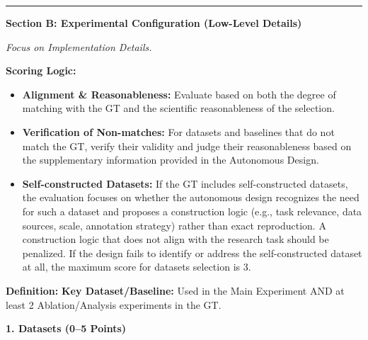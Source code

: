 \begin{tcolorbox}[
	title={Box 7: Full Evaluation Prompt},
	colback=blue!3!white,
	colframe=blue!30!black,
	colbacktitle=blue!15!white,
	coltitle=black,
	fonttitle=\bfseries,
	arc=3mm,
	boxrule=0.8pt,
	breakable
]
\medskip\hrule\medskip

\textbf{Section B: Experimental Configuration (Low-Level Details)}

\textit{Focus on Implementation Details.}

\textbf{Scoring Logic:}
\begin{itemize}[nosep,leftmargin=12pt]
	\item \textbf{Alignment \& Reasonableness:} Evaluate based on both the degree of matching with the GT and the scientific reasonableness of the selection.
	\item \textbf{Verification of Non-matches:} For datasets and baselines that do not match the GT, verify their validity and judge their reasonableness based on the supplementary information provided in the Autonomous Design.
	\item \textbf{Self-constructed Datasets:} If the GT includes self-constructed datasets, the evaluation focuses on whether the autonomous design recognizes the need for such a dataset and proposes a construction logic (e.g., task relevance, data sources, scale, annotation strategy) rather than exact reproduction. A construction logic that does not align with the research task should be penalized. If the design fails to identify or address the self-constructed dataset at all, the maximum score for datasets selection is 3.
\end{itemize}

\smallskip
\textbf{Definition:} \textbf{Key Dataset/Baseline:} Used in the Main Experiment AND at least 2 Ablation/Analysis experiments in the GT.

\medskip
\textbf{1. Datasets (0--5 Points)}


\end{tcolorbox}
